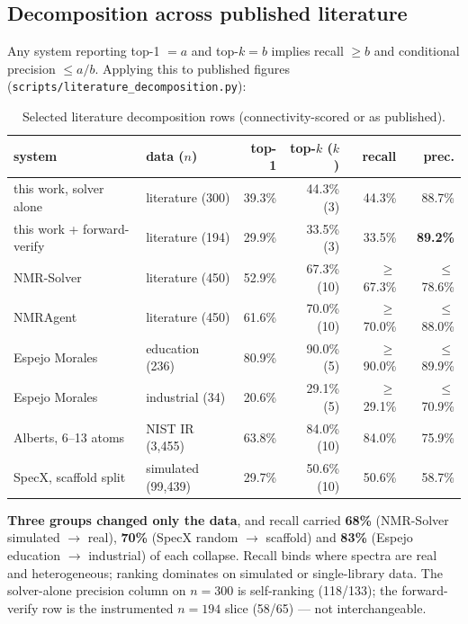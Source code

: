 \documentclass{article}
\begin{document}
\subsection{Decomposition across published literature}
\label{sec:literature}

Any system reporting top-1 $= a$ and top-$k = b$ implies recall $\geq b$ and conditional
precision $\leq a/b$.
Applying this to published figures (\texttt{scripts/literature\_decomposition.py}):

\begin{table}[ht]
\caption{Selected literature decomposition rows (connectivity-scored or as published).}
\label{tab:lit-decomp}
\centering
\scriptsize
\setlength{\tabcolsep}{3pt}
\begin{tabular}{@{}p{2.6cm}p{2.4cm}rrrr@{}}
\toprule
system & data ($n$) & top-1 & top-$k$ ($k$) & recall & prec. \\
\midrule
this work, solver alone & literature (300) & 39.3\% & 44.3\% (3) & 44.3\% & 88.7\% \\
this work + forward-verify & literature (194) & 29.9\% & 33.5\% (3) & 33.5\% & \textbf{89.2\%} \\
NMR-Solver~\citep{jin2025nmrsolver} & literature (450) & 52.9\% & 67.3\% (10) & $\geq$67.3\% & $\leq$78.6\% \\
NMRAgent~\citep{fang2026nmragent} & literature (450) & 61.6\% & 70.0\% (10) & $\geq$70.0\% & $\leq$88.0\% \\
Espejo Morales~\citep{espejo2026agentic} & education (236) & 80.9\% & 90.0\% (5) & $\geq$90.0\% & $\leq$89.9\% \\
Espejo Morales~\citep{espejo2026agentic} & industrial (34) & 20.6\% & 29.1\% (5) & $\geq$29.1\% & $\leq$70.9\% \\
Alberts, 6--13 atoms~\citep{alberts2025benchmarks} & NIST IR (3,455) & 63.8\% & 84.0\% (10) & 84.0\% & 75.9\% \\
SpecX, scaffold split~\citep{xiang2026specx} & simulated (99,439) & 29.7\% & 50.6\% (10) & 50.6\% & 58.7\% \\
\bottomrule
\end{tabular}
\end{table}

\textbf{Three groups changed only the data}, and recall carried \textbf{68\%} (NMR-Solver
simulated $\to$ real), \textbf{70\%} (SpecX random $\to$ scaffold) and \textbf{83\%}
(Espejo education $\to$ industrial) of each collapse.
Recall binds where spectra are real and heterogeneous; ranking dominates on simulated or
single-library data.
The solver-alone precision column on $n{=}300$ is self-ranking (118/133); the
forward-verify row is the instrumented $n{=}194$ slice (58/65) --- not interchangeable.
\end{document}

